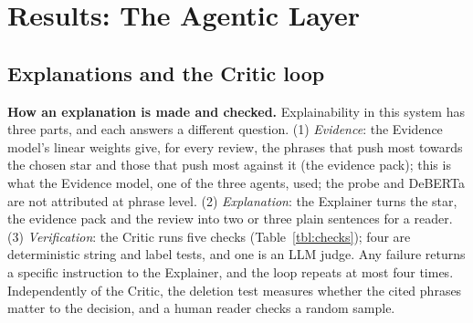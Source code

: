 \documentclass[runningheads]{llncs}
\begin{document}
\section{Results: The Agentic Layer}
\label{sec:agentic}

\subsection{Explanations and the Critic loop}

\textbf{How an explanation is made and checked.} Explainability in this system has three parts, and each answers a different question. (1) \emph{Evidence}: the Evidence model's linear weights give, for every review, the phrases that push most towards the chosen star and those that push most against it (the evidence pack); this is what the Evidence model, one of the three agents, used; the probe and DeBERTa are not attributed at phrase level. (2) \emph{Explanation}: the Explainer turns the star, the evidence pack and the review into two or three plain sentences for a reader. (3) \emph{Verification}: the Critic runs five checks (Table~\ref{tbl:checks}); four are deterministic string and label tests, and one is an LLM judge. Any failure returns a specific instruction to the Explainer, and the loop repeats at most four times. Independently of the Critic, the deletion test measures whether the cited phrases matter to the decision, and a human reader checks a random sample.

\begin{table}[t]
\centering
\caption{The Critic's five checks and how often each failed on the first draft (all 3\,000 test reviews; a draft can fail several checks).}
\label{tbl:checks}
\small
{}
\end{table}
\end{document}
